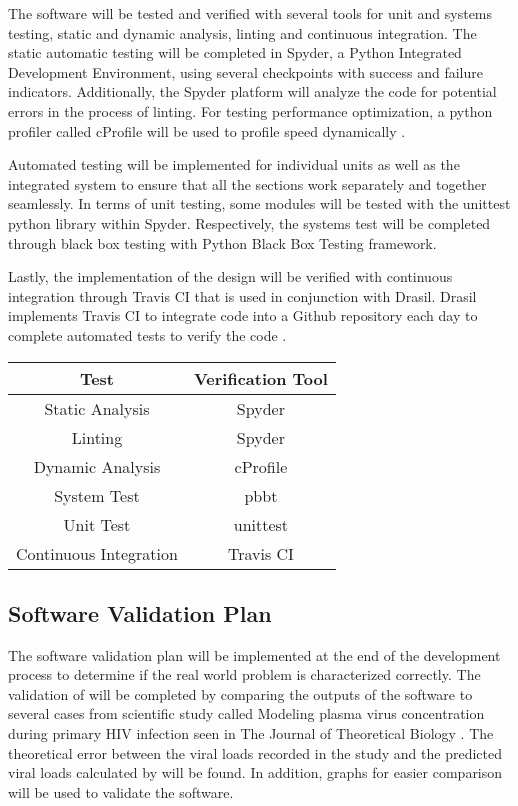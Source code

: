\documentclass[12pt, titlepage]{article}
\begin{document}
The \progname{} software will be tested and verified with several tools for 
unit and systems testing, static and dynamic analysis, linting and continuous 
integration. The static automatic testing will be completed in Spyder, a Python 
Integrated Development Environment, using several checkpoints with success and 
failure indicators. Additionally, the Spyder platform will analyze the code for 
potential errors in the process of linting. For testing performance optimization, a python profiler called cProfile will be used to profile speed dynamically
\citep{cProfile}.

Automated testing will be implemented for individual units as well as the 
integrated system to ensure that all the sections work separately and together 
seamlessly. In terms of unit  testing, some modules will be tested with the 
unittest python library within Spyder. Respectively, the systems test will be 
completed through black box testing with Python Black Box Testing framework.

Lastly, the implementation of the design will be verified with continuous 
integration through Travis CI that is used in conjunction with Drasil. Drasil 
implements Travis CI to integrate code into a Github repository each day to 
complete automated tests to verify the code \citep{Drasil}. 

\begin{center}
 \begin{tabular}{||c|c||} 
 \hline
 \textbf{Test} & \textbf{Verification Tool}\\ [0.5ex] 
 \hline
  Static Analysis & Spyder\\
 \hline
  Linting & Spyder\\
 \hline
  Dynamic Analysis & cProfile \\
 \hline
  System Test & pbbt\\
 \hline
  Unit Test & unittest \\
 \hline
  Continuous Integration & Travis CI\\ [1ex] 
 \hline
\end{tabular}
\end{center}		

\newpage

\subsection{Software Validation Plan}

The software validation plan will be implemented at the end of the development 
process to determine if the real world problem is characterized correctly. The 
validation of \progname{} will be completed by comparing the outputs of the 
software to several cases from scientific study called Modeling plasma virus 
concentration during primary HIV infection seen in The Journal of Theoretical 
Biology
\citep{Stafford2000}. The theoretical error between the viral loads recorded in the study and the predicted viral loads calculated by \progname{} will be found. In addition, graphs for easier comparison will be used to validate the software.
\end{document}
